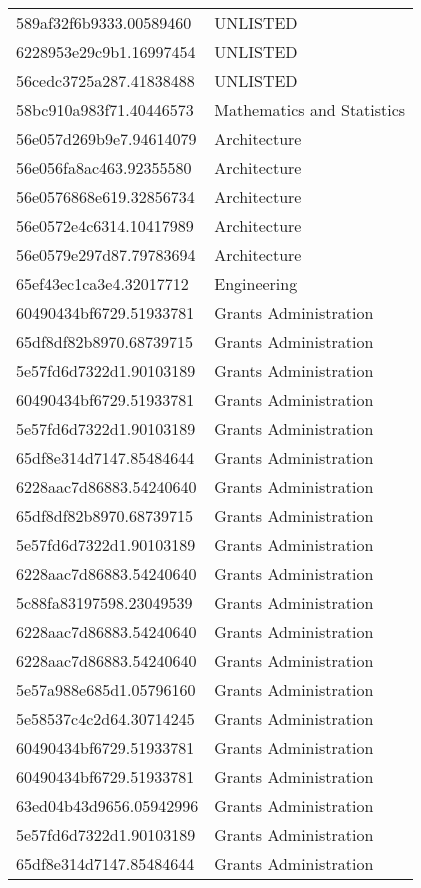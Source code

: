\begin{tabular}{ll}
589af32f6b9333.00589460 & UNLISTED \\
6228953e29c9b1.16997454 & UNLISTED \\
56cedc3725a287.41838488 & UNLISTED \\
58bc910a983f71.40446573 & Mathematics and Statistics \\
56e057d269b9e7.94614079 & Architecture \\
56e056fa8ac463.92355580 & Architecture \\
56e0576868e619.32856734 & Architecture \\
56e0572e4c6314.10417989 & Architecture \\
56e0579e297d87.79783694 & Architecture \\
65ef43ec1ca3e4.32017712 & Engineering \\
60490434bf6729.51933781 & Grants Administration \\
65df8df82b8970.68739715 & Grants Administration \\
5e57fd6d7322d1.90103189 & Grants Administration \\
60490434bf6729.51933781 & Grants Administration \\
5e57fd6d7322d1.90103189 & Grants Administration \\
65df8e314d7147.85484644 & Grants Administration \\
6228aac7d86883.54240640 & Grants Administration \\
65df8df82b8970.68739715 & Grants Administration \\
5e57fd6d7322d1.90103189 & Grants Administration \\
6228aac7d86883.54240640 & Grants Administration \\
5c88fa83197598.23049539 & Grants Administration \\
6228aac7d86883.54240640 & Grants Administration \\
6228aac7d86883.54240640 & Grants Administration \\
5e57a988e685d1.05796160 & Grants Administration \\
5e58537c4c2d64.30714245 & Grants Administration \\
60490434bf6729.51933781 & Grants Administration \\
60490434bf6729.51933781 & Grants Administration \\
63ed04b43d9656.05942996 & Grants Administration \\
5e57fd6d7322d1.90103189 & Grants Administration \\
65df8e314d7147.85484644 & Grants Administration \\

\end{tabular}
